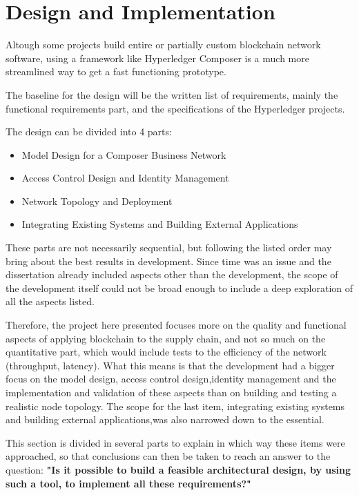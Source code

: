 \section{Design and Implementation}

Altough some projects build entire or partially custom blockchain network software, using a framework like Hyperledger Composer is a much more streamlined way to get a fast functioning prototype.

The baseline for the design will be the written list of requirements, mainly the functional requirements part, and the specifications of the Hyperledger projects.

The design can be divided into 4 parts:
\begin{itemize}
    \item Model Design for a Composer Business Network
    \item Access Control Design and Identity Management
    \item Network Topology and Deployment
    \item Integrating Existing Systems and Building External Applications
\end{itemize}

These parts are not necessarily sequential, but following the listed order may bring about the best results in development. Since time was an issue and the dissertation already included aspects other than the development, the scope of the development itself could not be broad enough to include a deep exploration of all the aspects listed.

Therefore, the project here presented focuses more on the quality and functional aspects of applying blockchain to the supply chain, and not so much on the quantitative part, which would include tests to the efficiency of the network (throughput, latency). What this means is that the development had a bigger focus on the model design, access control design,identity management and the implementation and validation of these aspects than on building and testing a realistic node topology. The scope for the last item, integrating existing systems and building external applications,was also narrowed down to the essential.

This section is divided in several parts to explain in which way these items were approached, so that conclusions can then be taken to reach an answer to the question: \textbf{"Is it possible to build a feasible architectural design, by using such a tool, to implement all these requirements?"}


